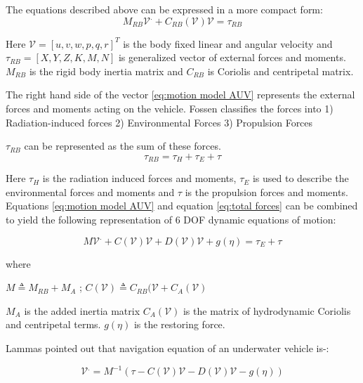 \documentclass[12pt,draft]{dalcsthesis}
\begin{document}
The equations described above can be expressed in a more compact form: 
\begin{equation}
\label{eq:motion model AUV}
M_{RB}\mathcal{{V}}^{.}+C_{RB}(\mathcal{V})\mathcal{V}=\tau_{RB}
\end{equation}

Here $\mathcal{V}=[u,v,w,p,q,r]^{T}$ is the body fixed linear and angular velocity and $\tau_{RB}=[X,Y,Z,K,M,N]$ is generalized vector of external forces and moments. $M_{RB}$ is the rigid body inertia matrix and $C_{RB}$ is Coriolis and centripetal matrix. 

The right hand side of the vector \ref{eq:motion model AUV} represents the external forces and moments acting on the vehicle. Fossen \cite{Thor} classifies the forces into 1) Radiation-induced forces 2) Environmental Forces 3) Propulsion Forces

$\tau_{RB}$ can be represented as the sum of these forces.
\begin{equation}
\label{eq:total forces}
 \tau_{RB} = \tau_{H} + \tau_{E} + \tau 
\end{equation}

Here $\tau_{H}$ is the radiation induced forces and moments, $\tau_{E}$ is used to describe the environmental forces and moments and $\tau$ is the propulsion forces and moments. Equations \ref{eq:motion model AUV} and equation \ref{eq:total forces} can be combined to yield the following representation of 6 DOF dynamic equations of motion:
 

\begin{equation}
\label{eq:vehicle hydrodynamics}
M\mathcal{{V}}^{.}+C(\mathcal{V})\mathcal{V}+D(\mathcal{V})\mathcal{V}+g(\eta)=\tau_{E}+\tau%
\end{equation}

where 

$M \triangleq M_{RB} + M_{A}$ ; $C(\mathcal{V}) \triangleq C_{RB}(\mathcal{V} + C_{A}(\mathcal{V})$

$M_A$ is the added inertia  matrix $C_{A}(\mathcal{V})$ is the matrix of hydrodynamic Coriolis and centripetal terms. $g(\eta)$ is the restoring force.

Lammas \cite{Lammas2004} pointed out that navigation equation of an underwater vehicle is-:

\begin{equation}
\label{eq-: navigation equation for AUV}
\mathcal{V}^{.} = M^{-1}(\tau-C(\mathcal{V})\mathcal{V}-D(\mathcal{V})\mathcal{V}-g(\eta))
\end{equation}
\end{document}

